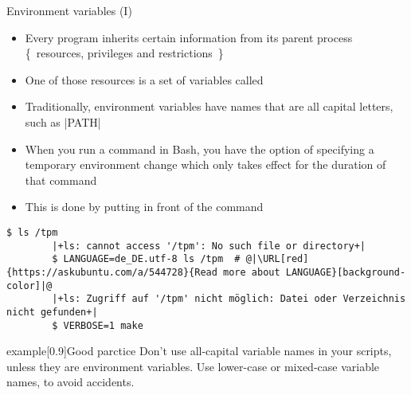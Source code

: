 \begin{frame}[fragile]{Environment variables (I)}
    \vspace{-3mm}
    \begin{itemize}
        \item Every program inherits certain information from its parent process {\tiny\{~resources, privileges and restrictions~\}}
        \item One of those resources is a set of variables called 
        \item Traditionally, environment variables have names that are all capital letters, such as \bash|PATH|
        \item When you run a command in Bash, you have the option of specifying a temporary environment change which only takes effect for the duration of that command
        \item This is done by putting  in front of the command
    \end{itemize}
    \begin{lstlisting}[style=MyBash]
        $ ls /tpm
        |+ls: cannot access '/tpm': No such file or directory+|
        $ LANGUAGE=de_DE.utf-8 ls /tpm  # @|\URL[red]{https://askubuntu.com/a/544728}{Read more about LANGUAGE}[background-color]|@
        |+ls: Zugriff auf '/tpm' nicht möglich: Datei oder Verzeichnis nicht gefunden+|
        $ VERBOSE=1 make
    \end{lstlisting}
    \begin{varblock}{example}[0.9\textwidth]{Good parctice}
        Don't use all-capital variable names in your scripts, unless they are environment variables.
        Use lower-case or mixed-case variable names, to avoid accidents.
    \end{varblock}
\end{frame}
